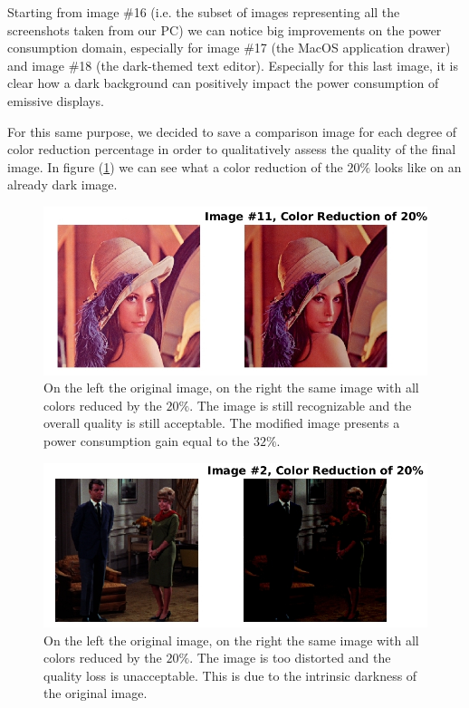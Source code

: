 \documentclass[a4paper]{article}
\begin{document}
            Starting from image \#16 (i.e. the subset of images representing all the screenshots taken from our PC) we can notice big improvements on the power consumption domain, especially for image \#17 (the MacOS application drawer) and image \#18 (the dark-themed text editor). Especially for this last image, it is clear how a dark background can positively impact the power consumption of emissive displays.

            For this same purpose, we decided to save a comparison image for each degree of color reduction percentage in order to qualitatively assess the quality of the final image. In figure (\ref{fig:color_reduction_20perc_img_11}) we can see what a color reduction of the $20\%$ looks like on an already dark image.

            \begin{figure}[htp]
                \centering
                \includegraphics[width=0.6 \columnwidth]{./screenshots/color_reduction_20perc_img_11.jpg}
                \caption{
                        \label{fig:color_reduction_20perc_img_11}
                        On the left the original image, on the right the same image with all colors reduced by the $20\%$. The image is still recognizable and the overall quality is still acceptable. The modified image presents a power consumption gain equal to the $32\%$.
                }
            \end{figure}

            \begin{figure}[htp]
                \centering
                \includegraphics[width=0.6 \columnwidth]{./screenshots/color_reduction_20perc_img_2.jpg}
                \caption{
                        \label{fig:color_reduction_20perc_img_2}
                        On the left the original image, on the right the same image with all colors reduced by the $20\%$. The image is too distorted and the quality loss is unacceptable. This is due to the intrinsic darkness of the original image.
                }
            \end{figure}
\end{document}
